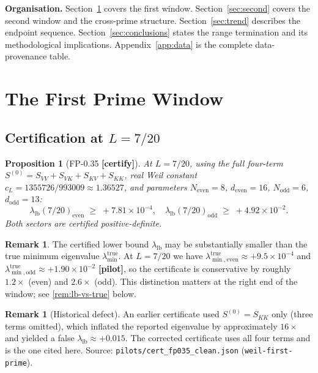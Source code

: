 \documentclass[12pt,a4paper]{amsart}
\theoremstyle{plain}
\newtheorem{proposition}[theorem]{Proposition}
\theoremstyle{definition}
\newtheorem{remark}[theorem]{Remark}
\newcommand{\llb}{\lambda_{\mathrm{lb}}}
\newcommand{\ltrue}{\lambda_{\min}^{\mathrm{true}}}
\newcommand{\ltrues}[1]{\lambda_{\min,\mathrm{#1}}^{\mathrm{true}}}
\newcommand{\cL}{c_L}
\newcommand{\certify}{\textbf{[certify]}}
\newcommand{\pilot}{\textbf{[pilot]}}
\begin{document}
\textbf{Organisation.}  Section~\ref{sec:first} covers the first window.
Section~\ref{sec:second} covers the second window and the cross-prime
structure.  Section~\ref{sec:trend} describes the endpoint sequence.
Section~\ref{sec:conclusions} states the range termination and its
methodological implications.  Appendix~\ref{app:data} is the complete
data-provenance table.

\section{The First Prime Window}
\label{sec:first}

\subsection{Certification at \texorpdfstring{$L=7/20$}{L=7/20}}

\begin{proposition}[FP-0.35 \certify]
\label{prop:fp035}
At $L = 7/20$, using the full four-term $S^{(0)}=S_{VV}+S_{VK}+S_{KV}+S_{KK}$,
real Weil constant $\cL = 1355726/993009 \approx 1.36527$, and parameters
$N_{\mathrm{even}}=8$, $d_{\mathrm{even}}=16$, $N_{\mathrm{odd}}=6$,
$d_{\mathrm{odd}}=13$:
\[
  \lambda_{\mathrm{lb}}(7/20)_{\mathrm{even}} \;\ge\; +7.81\times10^{-4},\quad
  \lambda_{\mathrm{lb}}(7/20)_{\mathrm{odd}}  \;\ge\; +4.92\times10^{-2}.
\]
Both sectors are certified positive-definite.
\end{proposition}

\begin{remark}
The certified lower bound $\lambda_{\mathrm{lb}}$ may be substantially smaller
than the true minimum eigenvalue $\ltrue$.  At $L=7/20$ we have
$\ltrues{even} \approx +9.5\times10^{-4}$ and
$\ltrues{odd} \approx +1.90\times10^{-2}$ \pilot, so the certificate
is conservative by roughly $1.2\times$ (even) and $2.6\times$ (odd).  This
distinction matters at the right end of the window; see
\cref{rem:lb-vs-true} below.
\end{remark}

\begin{remark}[Historical defect]
An earlier certificate used $S^{(0)} = S_{KK}$ only (three terms omitted),
which inflated the reported eigenvalue by approximately $16\times$ and yielded
a false $\llb \approx +0.015$.  The corrected certificate uses all four terms
and is the one cited here.  Source:
\texttt{pilots/cert\_fp035\_clean.json} (\texttt{weil-first-prime}).
\end{remark}
\end{document}
